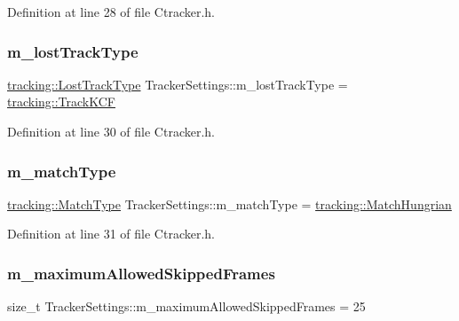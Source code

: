 Definition at line 28 of file Ctracker.\+h.

\mbox{\label{struct_tracker_settings_a61a59f1c5bcc2ee76cef1b174d4bb8a4}} 
\subsubsection{\texorpdfstring{m\+\_\+lost\+Track\+Type}{m\_lostTrackType}}
{\footnotesize\ttfamily \mbox{\hyperlink{namespacetracking_a5377d69122ad915004ef68a518d22be3}{tracking\+::\+Lost\+Track\+Type}} Tracker\+Settings\+::m\+\_\+lost\+Track\+Type = \mbox{\hyperlink{namespacetracking_a5377d69122ad915004ef68a518d22be3a9bba8e4377e562caa976576d47c5eb2e}{tracking\+::\+Track\+K\+CF}}}



Definition at line 30 of file Ctracker.\+h.

\mbox{\label{struct_tracker_settings_a94a05cbda5eeeac7fa1b64baf9c703f5}} 
\subsubsection{\texorpdfstring{m\+\_\+match\+Type}{m\_matchType}}
{\footnotesize\ttfamily \mbox{\hyperlink{namespacetracking_a491e50c9261ab820965d871a217d4f13}{tracking\+::\+Match\+Type}} Tracker\+Settings\+::m\+\_\+match\+Type = \mbox{\hyperlink{namespacetracking_a491e50c9261ab820965d871a217d4f13a8c97315e46df8c0716a9538655fc967d}{tracking\+::\+Match\+Hungrian}}}



Definition at line 31 of file Ctracker.\+h.

\mbox{\label{struct_tracker_settings_a7825c3e88ee979fba2844c238fc51139}} 
\subsubsection{\texorpdfstring{m\+\_\+maximum\+Allowed\+Skipped\+Frames}{m\_maximumAllowedSkippedFrames}}
{\footnotesize\ttfamily size\+\_\+t Tracker\+Settings\+::m\+\_\+maximum\+Allowed\+Skipped\+Frames = 25}



